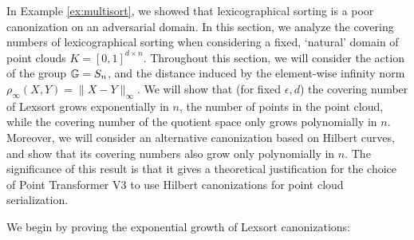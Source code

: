 \documentclass{article}
\begin{document}
In Example \ref{ex:multisort}, we showed that lexicographical sorting is a poor canonization on an adversarial domain. In this section, we analyze the covering numbers of lexicographical sorting when considering a fixed, `natural' domain of point clouds $K=[0,1]^{d\times n}$. Throughout this section, we will consider the action of the group $\mathbb{G}=S_n$, and the distance induced by the element-wise infinity norm $\rho_\infty(X,Y)=\|X-Y\|_\infty $. We will show that (for fixed $\epsilon,d$) the covering number of Lexsort grows exponentially in $n$, the number of points in the point cloud, while the covering number of the quotient space only grows polynomially in $n$. Moreover, we will consider an alternative canonization based on Hilbert curves, and show that its covering numbers also grow only polynomially in $n$. The significance of this result is that it gives a theoretical justification for the choice of  Point Transformer V3 \cite{wu2024ptv3} to use Hilbert canonizations for point cloud serialization.   

We begin by proving the exponential growth of Lexsort canonizations:
\end{document}

